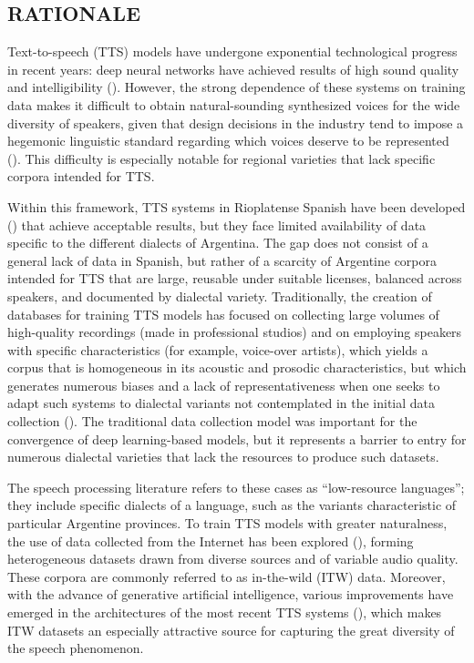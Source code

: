 \subsection{RATIONALE}

Text-to-speech (TTS) models have undergone exponential technological progress in recent years: deep neural networks have achieved results of high sound quality and intelligibility (\cite{survey1}). However, the strong dependence of these systems on training data makes it difficult to obtain natural-sounding synthesized voices for the wide diversity of speakers, given that design decisions in the industry tend to impose a hegemonic linguistic standard regarding which voices deserve to be represented (\cite{markl2023language}). This difficulty is especially notable for regional varieties that lack specific corpora intended for TTS.

Within this framework, TTS systems in Rioplatense Spanish have been developed (\cite{sintetica}) that achieve acceptable results, but they face limited availability of data specific to the different dialects of Argentina. The gap does not consist of a general lack of data in Spanish, but rather of a scarcity of Argentine corpora intended for TTS that are large, reusable under suitable licenses, balanced across speakers, and documented by dialectal variety. Traditionally, the creation of databases for training TTS models has focused on collecting large volumes of high-quality recordings (made in professional studios) and on employing speakers with specific characteristics (for example, voice-over artists), which yields a corpus that is homogeneous in its acoustic and prosodic characteristics, but which generates numerous biases and a lack of representativeness when one seeks to adapt such systems to dialectal variants not contemplated in the initial data collection (\cite{koenecke2020racial}). The traditional data collection model was important for the convergence of deep learning-based models, but it represents a barrier to entry for numerous dialectal varieties that lack the resources to produce such datasets.

The speech processing literature refers to these cases as ``low-resource languages''; they include specific dialects of a language, such as the variants characteristic of particular Argentine provinces. To train TTS models with greater naturalness, the use of data collected from the Internet has been explored (\cite{erica}), forming heterogeneous datasets drawn from diverse sources and of variable audio quality. These corpora are commonly referred to as in-the-wild (ITW) data. Moreover, with the advance of generative artificial intelligence, various improvements have emerged in the architectures of the most recent TTS systems (\cite{survey2}), which makes ITW datasets an especially attractive source for capturing the great diversity of the speech phenomenon.

